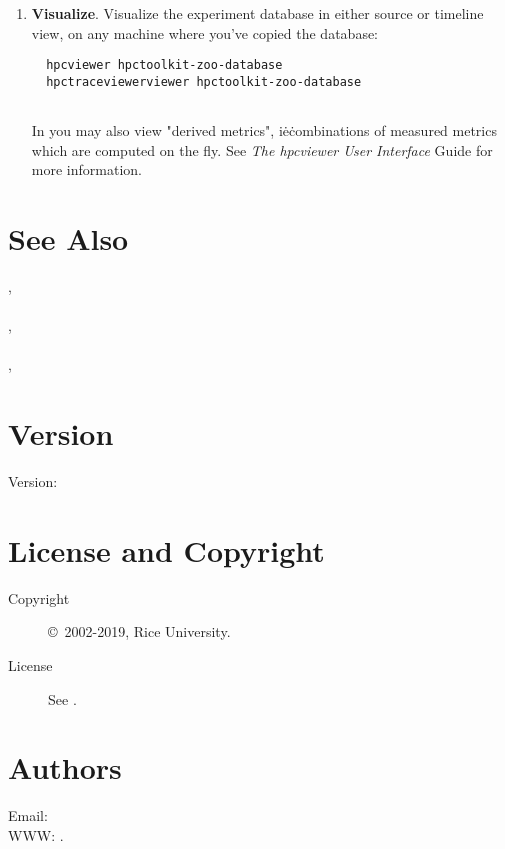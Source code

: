 \documentclass[english]{article}
\begin{document}
\begin{enumerate}
\item \textbf{Visualize}.
Visualize the experiment database in either source or timeline view,
on any machine where you've copied the database:
\begin{verbatim}
  hpcviewer hpctoolkit-zoo-database
  hpctraceviewerviewer hpctoolkit-zoo-database
  
\end{verbatim}
In  you may also view "derived metrics",
i\.e\. combinations of measured metrics which are computed on the fly.
See \emph{The hpcviewer User Interface} Guide for more information.

\end{enumerate}



\section{See Also}

,
   \\
 \\
,
   \\
  \SP\SP {} \\
,

\section{Version}

Version: \Version

\section{License and Copyright}

\begin{description}
\item[Copyright] \copyright\ 2002-2019, Rice University.
\item[License] See .
\end{description}

\section{Authors}

Email:  \\
WWW: .

\LatexManEnd
\end{document}

